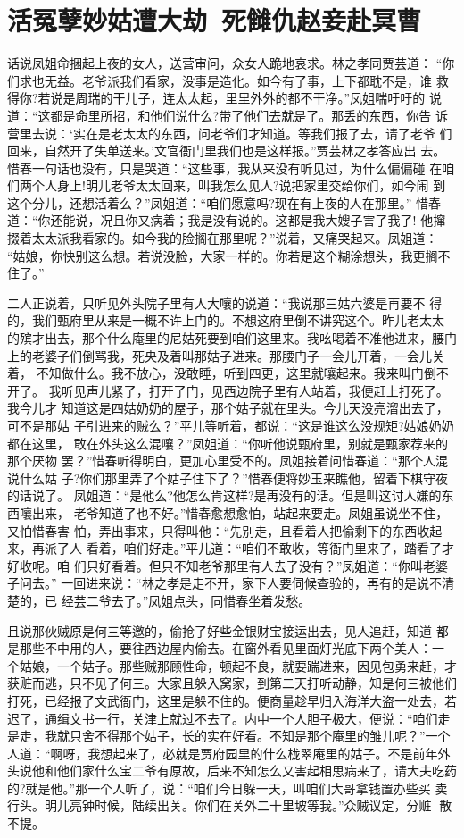 \chapter{活冤孽妙姑遭大劫~死雠仇赵妾赴冥曹}

话说凤姐命捆起上夜的女人，送营审问，众女人跪地哀求。林之孝同贾芸道：
“你们求也无益。老爷派我们看家，没事是造化。如今有了事，上下都耽不是，谁
救得你?若说是周瑞的干儿子，连太太起，里里外外的都不干净。”凤姐喘吁吁的
说道：“这都是命里所招，和他们说什么?带了他们去就是了。那丢的东西，你告
诉营里去说：‘实在是老太太的东西，问老爷们才知道。等我们报了去，请了老爷
们回来，自然开了失单送来。’文官衙门里我们也是这样报。”贾芸林之孝答应出
去。惜春一句话也没有，只是哭道：“这些事，我从来没有听见过，为什么偏偏碰
在咱们两个人身上!明儿老爷太太回来，叫我怎么见人?说把家里交给你们，如今闹
到这个分儿，还想活着么？”凤姐道：“咱们愿意吗?现在有上夜的人在那里。”
惜春道：“你还能说，况且你又病着；我是没有说的。这都是我大嫂子害了我了!
他撺掇着太太派我看家的。如今我的脸搁在那里呢？”说着，又痛哭起来。凤姐道：
“姑娘，你快别这么想。若说没脸，大家一样的。你若是这个糊涂想头，我更搁不
住了。”

二人正说着，只听见外头院子里有人大嚷的说道：“我说那三姑六婆是再要不
得的，我们甄府里从来是一概不许上门的。不想这府里倒不讲究这个。昨儿老太太
的殡才出去，那个什么庵里的尼姑死要到咱们这里来。我吆喝着不准他进来，腰门
上的老婆子们倒骂我，死央及着叫那姑子进来。那腰门子一会儿开着，一会儿关着，
不知做什么。我不放心，没敢睡，听到四更，这里就嚷起来。我来叫门倒不开了。
我听见声儿紧了，打开了门，见西边院子里有人站着，我便赶上打死了。我今儿才
知道这是四姑奶奶的屋子，那个姑子就在里头。今儿天没亮溜出去了，可不是那姑
子引进来的贼么？”平儿等听着，都说：“这是谁这么没规矩?姑娘奶奶都在这里，
敢在外头这么混嚷？”凤姐道：“你听他说甄府里，别就是甄家荐来的那个厌物
罢？”惜春听得明白，更加心里受不的。凤姐接着问惜春道：“那个人混说什么姑
子?你们那里弄了个姑子住下了？”惜春便将妙玉来瞧他，留着下棋守夜的话说了。
凤姐道：“是他么?他怎么肯这样?是再没有的话。但是叫这讨人嫌的东西嚷出来，
老爷知道了也不好。”惜春愈想愈怕，站起来要走。凤姐虽说坐不住，又怕惜春害
怕，弄出事来，只得叫他：“先别走，且看着人把偷剩下的东西收起来，再派了人
看着，咱们好走。”平儿道：“咱们不敢收，等衙门里来了，踏看了才好收呢。咱
们只好看着。但只不知老爷那里有人去了没有？”凤姐道：“你叫老婆子问去。”
一回进来说：“林之孝是走不开，家下人要伺候查验的，再有的是说不清楚的，已
经芸二爷去了。”凤姐点头，同惜春坐着发愁。

且说那伙贼原是何三等邀的，偷抢了好些金银财宝接运出去，见人追赶，知道
都是那些不中用的人，要往西边屋内偷去。在窗外看见里面灯光底下两个美人：一
个姑娘，一个姑子。那些贼那顾性命，顿起不良，就要踹进来，因见包勇来赶，才
获赃而逃，只不见了何三。大家且躲入窝家，到第二天打听动静，知是何三被他们
打死，已经报了文武衙门，这里是躲不住的。便商量趁早归入海洋大盗一处去，若
迟了，通缉文书一行，关津上就过不去了。内中一个人胆子极大，便说：“咱们走
是走，我就只舍不得那个姑子，长的实在好看。不知是那个庵里的雏儿呢？”一个
人道：“啊呀，我想起来了，必就是贾府园里的什么栊翠庵里的姑子。不是前年外
头说他和他们家什么宝二爷有原故，后来不知怎么又害起相思病来了，请大夫吃药
的?就是他。”那一个人听了，说：“咱们今日躲一天，叫咱们大哥拿钱置办些买
卖行头。明儿亮钟时候，陆续出关。你们在关外二十里坡等我。”众贼议定，分赃
散不提。

